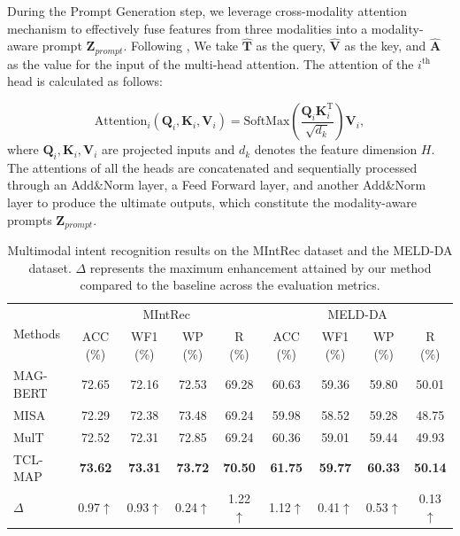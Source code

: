 \documentclass[letterpaper]{article} %
\begin{document}
During the Prompt Generation step, we leverage cross-modality attention mechanism to effectively fuse features from three modalities into a modality-aware prompt $\textbf{Z}_{prompt}$. Following \cite{tsai2019multimodal}, We take $\hat{\textbf{T}}$ as the query, $\hat{\textbf{V}}$ as the key, and $\hat{\textbf{A}}$ as the value for the input of the multi-head attention. The attention of the $i^{\text{th}}$ head is calculated as follows:

\begin{equation}
\text{Attention}_{i}(\textbf{Q}_{i}, \textbf{K}_{i}, \textbf{V}_{i}) = \text{SoftMax}(\frac{\textbf{Q}_{i}\textbf{K}_{i}^{\text{T}}}{\sqrt{d_{k}}})\textbf{V}_{i},
\end{equation}
where $\textbf{Q}_{i}, \textbf{K}_{i}, \textbf{V}_{i}$ are projected inputs and $d_{k}$ denotes the feature dimension $H$. The attentions of all the heads are concatenated and sequentially processed through an Add\&Norm layer, a Feed Forward layer, and another Add\&Norm layer to produce the ultimate outputs, which constitute the modality-aware prompts $\textbf{Z}_{prompt}$.


\begin{table}[t!]
\centering
\begin{tabular}{@{\extracolsep{11pt}}l|cccc|cccc}
\toprule
\multirow{2}{*}{Methods}
& \multicolumn{4}{c|}{MIntRec}& \multicolumn{4}{c}{MELD-DA}\\

& ACC (\%) & WF1 (\%) & WP (\%) & R (\%) & ACC (\%) & WF1 (\%) & WP (\%) & R (\%) \\
\midrule
MAG-BERT & 72.65 & 72.16 & 72.53 & 69.28 & 60.63 & 59.36 & 59.80  & 50.01  \\

MISA & 72.29 & 72.38 & 73.48 & 69.24 & 59.98 & 58.52 & 59.28  & 48.75  \\

MulT & 72.52 & 72.31 & 72.85 & 69.24 & 60.36 & 59.01 & 59.44  & 49.93  \\

\midrule

TCL-MAP &
\textbf{73.62} &
\textbf{73.31} &
\textbf{73.72} &
\textbf{70.50} &
\textbf{61.75} &
\textbf{59.77} &
\textbf{60.33}  &
\textbf{50.14}  \\
$\Delta$ & 0.97$\uparrow$ & 0.93$\uparrow$ & 0.24$\uparrow$ &
1.22$\uparrow$ & 1.12$\uparrow$ & 0.41$\uparrow$ & 0.53$\uparrow$  & 0.13$\uparrow$ \\
\bottomrule
\end{tabular}
\caption{\protect \label{results}
Multimodal intent recognition results on the MIntRec dataset and the MELD-DA dataset. $\Delta$ represents the maximum enhancement attained by our method compared to the baseline across the evaluation metrics.}

\end{table}
\end{document}

